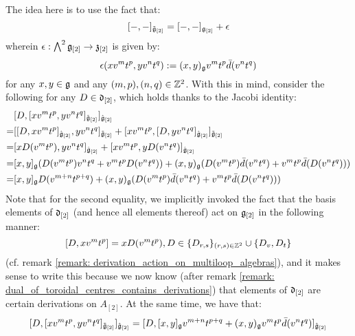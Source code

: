 \begin{remark}
\begin{enumerate}
                The idea here is to use the fact that:
                    $$[-, -]_{\tilde{\g}_{[2]}} = [-, -]_{\g_{[2]}} + \e$$
                wherein $\e: \bigwedge^2 \g_{[2]} \to \z_{[2]}$ is given by:
                    $$\e(x v^m t^p, y v^n t^q) := (x, y)_{\g} v^m t^p \bar{d}(v^n t^q)$$
                for any $x, y \in \g$ and any $(m, p), (n, q) \in \Z^2$. With this in mind, consider the following for any $D \in \d_{[2]}$, which holds thanks to the Jacobi identity:
                    $$
                        \begin{aligned}
                            & [ D, [x v^m t^p, y v^n t^q]_{\tilde{\g}_{[2]}} ]_{\hat{\g}_{[2]}}
                            \\
                            = & [ [D, x v^m t^p]_{\hat{\g}_{[2]}}, y v^n t^q ]_{\tilde{\g}_{[2]}} + [ x v^m t^p, [D, y v^n t^q]_{\hat{\g}_{[2]}} ]_{\tilde{\g}_{[2]}}
                            \\
                            = & [x D(v^m t^p), y v^n t^q]_{\hat{\g}_{[2]}} + [x v^m t^p, y D(v^n t^q)]_{\hat{\g}_{[2]}}
                            \\
                            = & [x, y]_{\g} (D(v^m t^p) v^n t^q + v^m t^p D(v^n t^q)) + (x, y)_{\g} ( D(v^m t^p) \bar{d}(v^n t^q) + v^m t^p \bar{d}(D(v^n t^q)) )
                            \\
                            = & [x, y]_{\g} D(v^{m + n} t^{p + q}) + (x, y)_{\g} ( D(v^m t^p) \bar{d}(v^n t^q) + v^m t^p \bar{d}(D(v^n t^q)) )
                        \end{aligned}
                    $$
                Note that for the second equality, we implicitly invoked the fact that the basis elements of $\d_{[2]}$ (and hence all elements thereof) act on $\g_{[2]}$ in the following manner:
                    $$[D, x v^m t^p] = x D(v^m t^p), D \in \{D_{r, s}\}_{(r, s) \in \Z^2} \cup \{D_v, D_t\}$$
                (cf. remark \ref{remark: derivation_action_on_multiloop_algebras}), and it makes sense to write this because we now know (after remark \ref{remark: dual_of_toroidal_centres_contains_derivations}) that elements of $\d_{[2]}$ are certain derivations on $A_{[2]}$. At the same time, we have that:
                    $$
                        \begin{aligned}
                            [ D, [x v^m t^p, y v^n t^q]_{\tilde{\g}_{[2]}} ]_{\hat{\g}_{[2]}} & = [ D, [x, y]_{\g} v^{m + n} t^{p + q} + (x, y)_{\g} v^m t^p \bar{d}(v^n t^q) ]_{\hat{\g}_{[2]}}
                            \\

\end{aligned}$$
\end{enumerate}
\end{remark}
